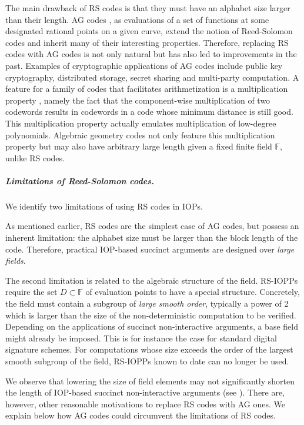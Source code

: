 \documentclass[a4paper,USenglish,autoref]{lipics-v2021}
\newcommand\F{\mathbb{F}}
\begin{document}
The main drawback of RS codes is that they must have an alphabet size larger than their length. AG codes \cite{Goppa77}, as evaluations of a set of functions at some designated rational points on a given curve, extend the notion of Reed-Solomon codes and inherit many of their interesting properties. Therefore, replacing RS codes with AG codes is not only natural but has also led to improvements in the past. Examples of cryptographic applications of AG codes include public key cryptography, distributed storage, secret sharing and multi-party computation. A feature for a family of codes that facilitates arithmetization is a multiplication property \cite{Mei13}, namely the fact that the component-wise multiplication of two codewords results in codewords in a code whose minimum distance is still good. This multiplication property actually emulates multiplication of low-degree polynomials. Algebraic geometry codes not only feature this multiplication property but may also have arbitrary large length given a fixed finite field $\F$, unlike RS codes. 


\subparagraph*{Limitations of Reed-Solomon codes.}
We identify two limitations of using RS codes in IOPs.

As mentioned earlier, RS codes are the simplest case of AG codes, but possess an inherent limitation: the alphabet size must be larger than the block length of the code. Therefore, practical IOP-based succinct arguments are designed over \emph{large fields}.

The second limitation is related to the algebraic structure of the field. RS-IOPPs \cite{BS08, BBHR18a} require the set $D \subset \F$ of evaluation points to have a special structure. Concretely,
the field must contain a subgroup of \emph{large smooth order}, typically a power of 2 which is larger than the size of the non-deterministic computation to be verified. Depending on the applications of succinct non-interactive arguments, a base field might already be imposed. This is for instance the case for standard digital signature schemes. For computations whose size exceeds the order of the largest smooth subgroup of the field, RS-IOPPs known to date can no longer be used.    

We observe that lowering the size of field elements may not significantly shorten the length of IOP-based succinct non-interactive arguments (see \cite{BCS16}). There are, however, other reasonable motivations to replace RS codes with AG ones. We explain below how AG codes could circumvent the limitations of RS codes.
\end{document}
